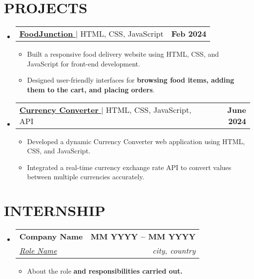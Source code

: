 \documentclass[letterpaper,11pt]{article}
\makeatletter
\newcommand{\resumeItem}[1]{
  \item\small{
    {#1 \vspace{-2pt}}
  }
}
\newcommand{\resumeSubheading}[4]{
  \vspace{-2pt}\item
    \begin{tabular*}{1.0\textwidth}[t]{l@{\extracolsep{\fill}}r}
      \textbf{\large#1} & \textbf{\small #2} \\
      \textit{\large#3} & \textit{\small #4} \\
     
    \end{tabular*}\vspace{-7pt}
}
\newcommand{\resumeProjectHeading}[2]{
    \item
    \begin{tabular*}{1.001\textwidth}{l@{\extracolsep{\fill}}r}
      \small#1 & \textbf{\small #2}\\
    \end{tabular*}\vspace{-7pt}
}
\newcommand{\resumeSubHeadingListStart}{\begin{itemize}[leftmargin=0.0in, label={}]}
\newcommand{\resumeSubHeadingListEnd}{\end{itemize}}
\newcommand{\resumeItemListStart}{\begin{itemize}}
\newcommand{\resumeItemListEnd}{\end{itemize}\vspace{-5pt}}
\makeatother
\begin{document}
\section{PROJECTS}
    \vspace{-5pt}
    \resumeSubHeadingListStart
       \resumeProjectHeading
          {\href{ProjectLink.com}{\textbf{\large{\underline{FoodJunction}}} \href{https://github.com/stymrj/FoodJunction}{\raisebox{-0.1\height}\faExternalLink }} $|$ \large{{HTML, CSS, JavaScript}}}{Feb 2024}
          \resumeItemListStart
            \resumeItem{\normalsize{Built a responsive food delivery website using HTML, CSS, and JavaScript for front-end development.
            }}
            \resumeItem{\normalsize{
            Designed user-friendly interfaces for \textbf{ browsing food items, adding them to the cart, and placing orders}.}}
          
          \resumeItemListEnd
          \vspace{-11pt}
         
      \resumeProjectHeading
          {\href{ProjectLink.com}{\textbf{\large{\underline{Currency Converter}}} \href{https://github.com/stymrj/Currency-Converter}{\raisebox{-0.1\height}\faExternalLink }} $|$ \large{{HTML, CSS, JavaScript, API}}}{June 2024}
          \resumeItemListStart
            \resumeItem{\normalsize{Developed a dynamic Currency Converter web application using HTML, CSS, and JavaScript.}}
            \resumeItem{\normalsize{
            Integrated a real-time currency exchange rate API to convert values between multiple currencies accurately.}}
          \resumeItemListEnd
          \vspace{-13pt}
 
    \resumeSubHeadingListEnd
\vspace{-2pt}
%


\section{INTERNSHIP}
  \resumeSubHeadingListStart


    \resumeSubheading
      {Company Name \href{certificate Link}{\raisebox{-0.1\height}\faExternalLink }}{MM YYYY -- MM YYYY}
      {\underline{Role Name}}{city, country}
      \resumeItemListStart
        \resumeItem{\normalsize{About the role \textbf{and responsibilities carried out.}}}
 
      \resumeItemListEnd  
  \resumeSubHeadingListEnd
\vspace{-12pt}
\end{document}
